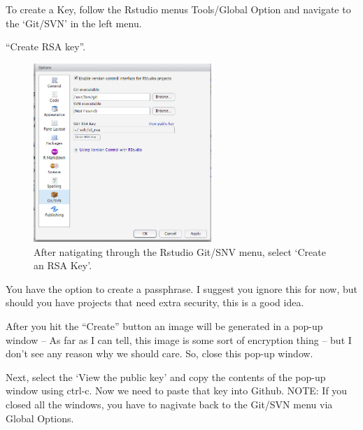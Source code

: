 \documentclass[12pt]{../SOP4_alpha}\usepackage[]{graphicx}\usepackage[]{color}
\begin{document}
\NP To create a Key, follow the Rstudio menus Tools/Global Option and navigate to the `Git/SVN' in the left menu.

\NP ``Create RSA key''. 

\begin{figure}
\centering
\includegraphics[width=0.6\textwidth]{graphics/CreatingSSH.jpg}
\caption{After natigating through the Rstudio Git/SNV menu, select `Create an RSA Key'.}
\end{figure}

\NP You have the option to create a passphrase. I suggest you ignore this for now, but should you have projects that need extra security, this is a good idea.

\NP After you hit the ``Create'' button an image will be generated in a pop-up window -- As far as I can tell, this image is some sort of encryption thing -- but I don't see any reason why we should care. So, close this pop-up window. 

\NP Next, select the `View the public key' and copy the contents of the pop-up window using ctrl-c. Now we need to paste that key into Github. NOTE: If you closed all the windows, you have to nagivate back to the Git/SVN menu via Global Options. 
\end{document}
